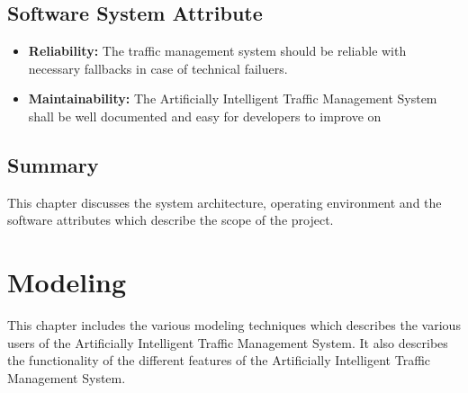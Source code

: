 \documentclass[openany,12pt]{report}
\begin{document}
	\section{Software System Attribute}
	\begin{itemize}
		
		\item{\textbf{Reliability:} The traffic management system should be reliable with necessary fallbacks in case of technical failuers.}
		
		\item{\textbf{Maintainability:}  The Artificially Intelligent Traffic Management System shall be well documented and easy for developers to improve on}
		
	\end{itemize}
	
	\section{Summary}
	\hspace*{0.5in} This chapter discusses the system architecture, operating environment and the software attributes which describe the scope of the project.
	
	\chapter{Modeling}
	
	\hspace*{0.5in} This chapter includes the various modeling techniques which describes the various users of the Artificially Intelligent Traffic Management System. It also describes the functionality of the different features of the Artificially Intelligent Traffic Management System.
	
\end{document}
